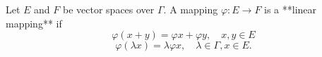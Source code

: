 Let $E$ and $F$ be vector spaces over $\Gamma$. A mapping $\varphi: E \to F$ is a **linear mapping** if
$$\varphi(x+y) = \varphi x + \varphi y, \quad x, y \in E$$
$$\varphi(\lambda x) = \lambda \varphi x, \quad \lambda \in \Gamma, x \in E.$$
